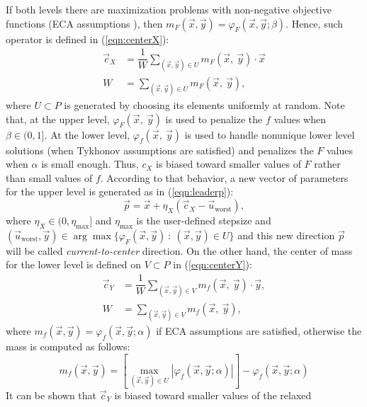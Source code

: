 \documentclass[conference]{IEEEtran}
\theoremstyle{definition}
\begin{document}
If both levels there are maximization problems with non-negative objective functions
(ECA assumptions \cite{Mejia2018}), then $m_F(\vec{x}, \vec{y}) = \varphi_F (\vec{x}, \vec{y}; \beta)$.
Hence, such operator is defined in (\ref{eqn:centerX}):
% 
\begin{align}
    \label{eqn:centerX}
    \vec{c}_X &= \dfrac{1}{W} \sum_{(\vec{x}, \vec{y})\in U} m_F(\vec{x},\ \vec{y}) \cdot \vec{x}\\
            W &= \sum_{(\vec{x}, \vec{y})\in U} m_F(\vec{x},\ \vec{y}), \nonumber
\end{align}
% 
where $U \subset P$ is generated by choosing its elements uniformly at random.
Note that, at the upper level, $\varphi_F (\vec{x},\ \vec{y})$ is used to penalize
the $f$ values when $\beta\in (0, 1]$. At the lower level, $\varphi_f (\vec{x},\ \vec{y})$
is used to handle nonunique lower level solutions (when Tykhonov assumptions are 
satisfied) and penalizes the $F$ values when $\alpha$ is small enough. Thus, $c_X$
is biased toward smaller values of $F$ rather than small values of $f$. According
to that behavior, a new vector of parameters for the upper level is generated as
in (\ref{eqn:leaderp}):
% 
\begin{equation}
    \vec{p} = \vec{x} + \eta_{X} (\vec{c}_X - \vec{u}_{\text{worst}}),
    \label{eqn:leaderp}
\end{equation}
% 
where $\eta_{X} \in (0, \eta_{\max}]$ and $\eta_{\max}$ is the user-defined stepsize and  
$
    (\vec{u}_{\text{worst}}, \vec{y}) \in \arg \max \{\varphi_F(\vec{x}, \vec{y} )  \ : \ (\vec{x}, \vec{y}) \in U \} 
$ %
% 
and this new direction $\vec{p}$ will be called \textit{current-to-center} direction. %
On the other hand, the center of mass for the lower level is defined on
$V \subset P$ in (\ref{eqn:centerY}):
% 
\begin{align}
    \label{eqn:centerY}
    \vec{c}_Y &= \dfrac{1}{W} \sum_{(\vec{x}, \vec{y})\in V} m_f(\vec{x},\ \vec{y}) \cdot \vec{y},\\
         W &= \sum_{(\vec{x}, \vec{y})\in V} m_f(\vec{x},\ \vec{y}) , \nonumber
\end{align}
% 
where $m_f(\vec{x}, \vec{y}) = \varphi_f(\vec{x}, \vec{y}; \alpha )$ if ECA assumptions
are satisfied, otherwise the mass is computed as follows:
% 
\[
    m_f(\vec{x}, \vec{y}) =
        \left[ \max_{(\vec{x}, \vec{y})\in U} |\varphi_f (\vec{x}, \vec{y}; \alpha)| \right]
        - \varphi_f (\vec{x}, \vec{y}; \alpha)
\]
% 
It can be shown that $\vec{c}_Y$ is biased toward smaller values of the relaxed
\end{document}
